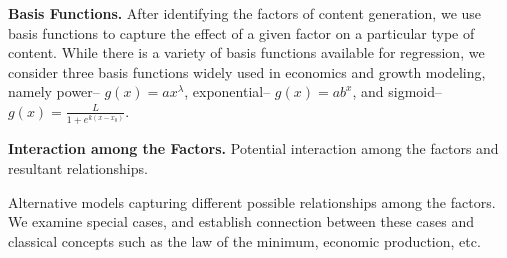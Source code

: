\textbf{Basis Functions.} After identifying the factors of content generation, we use basis functions to capture the effect of a given factor on a particular type of content. While there is a variety of basis functions available for regression, we consider three basis functions widely used in economics and growth modeling, namely power-- $g(x) = ax^{\lambda}$, exponential-- $g(x) = ab^x$, and sigmoid-- $g(x) = \frac{L}{1+e^{k(x-x_0)}}$. 

\textbf{Interaction among the Factors.} Potential interaction among the factors and resultant relationships.


Alternative models capturing different possible relationships among the factors. We examine special cases, and establish connection between these cases and classical concepts such as the law of the minimum, economic production, etc.


